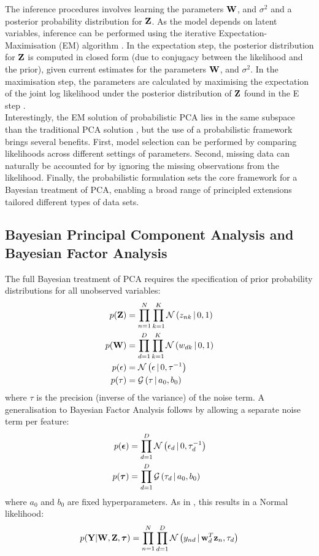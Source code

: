 The inference procedures involves learning the parameters ${\bf W}$, and $\sigma^2$ and a posterior probability distribution for ${\bf Z}$. As the model depends on latent variables, inference can be performed using the iterative Expectation-Maximisation (EM) algorithm \cite{Rubin1982,Bishop2006}. In the expectation step, the posterior distribution for ${\bf Z}$ is computed in closed form (due to conjugacy between the likelihood and the prior), given current estimates for the parameters ${\bf W}$, and $\sigma^2$. In the maximisation step, the parameters are calculated by maximising the expectation of the joint log likelihood under the posterior distribution of ${\bf Z}$ found in the E step \cite{Tipping1999}.\\
Interestingly, the EM solution of probabilistic PCA lies in the same subspace than the traditional PCA solution \cite{Tipping1999}, but the use of a probabilistic framework brings several benefits. First, model selection can be performed by comparing likelihoods across different settings of parameters. Second, missing data can naturally be accounted for by ignoring the missing observations from the likelihood. Finally, the probabilistic formulation sets the core framework for a Bayesian treatment of PCA, enabling a broad range of principled extensions tailored different types of data sets.


\subsection{Bayesian Principal Component Analysis and Bayesian Factor Analysis} \label{section:bayesian_pca}

The full Bayesian treatment of PCA requires the specification of prior probability distributions for all unobserved variables:
\begin{align*}
	p({\bf Z}) &= \prod_{n=1}^{N} \prod_{k=1}^{K} \mathcal{N}\left(z_{nk} \,|\, 0,1\right) \\
	p({\bf W}) &= \prod_{d=1}^{D} \prod_{k=1}^{K} \mathcal{N}\left(w_{dk} \,|\, 0,1\right) \\
	p(\epsilon) &= \mathcal{N}\left(\epsilon \,|\, 0,\tau^{-1}\right) \\
	p(\tau) &= \mathcal{G}\left(\tau \,|\, a_0,b_0\right)
\end{align*}
where $\tau$ is the precision (inverse of the variance) of the noise term. A generalisation to Bayesian Factor Analysis follows by allowing a separate noise term per feature:
\begin{align*}
	p(\mbox{\boldmath $\epsilon$}) &= \prod_{d=1}^{D} \mathcal{N}\left(\epsilon_d \,|\, 0,\tau_d^{-1}\right) \\
	p(\mbox{\boldmath $\tau$}) &= \prod_{d=1}^{D} \mathcal{G}\left(\tau_d \,|\, a_0,b_0\right)
\end{align*}
where $a_0$ and $b_0$ are fixed hyperparameters. As in , this results in a Normal likelihood:
\[
	p({\bf Y}|{\bf W},{\bf Z},\mbox{\boldmath $\tau$}) = \prod_{n=1}^{N} \prod_{d=1}^{D} \mathcal{N}\left(y_{nd} \,|\, {\bf w}_{d}^T {\bf z}_{n},\tau_d\right)
\]

